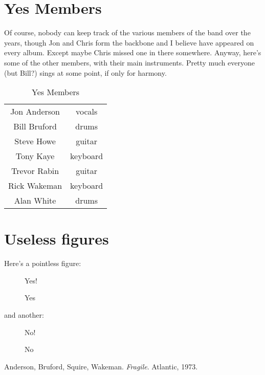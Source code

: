 \documentclass{easychithesis}
\begin{document}
\chapter{Yes Members}
Of course, nobody can keep track of the various members of the band 
over the years, though Jon and Chris form the backbone and I believe 
have appeared on every album.  Except maybe Chris missed one in there 
somewhere.  Anyway, here's some of the other members, with their main 
instruments.  Pretty much everyone (but Bill?) sings at some point, if 
only for harmony.
\begin{table}[h]
\begin{center}
\begin{tabular}{|c|c|}
        \hline
        Jon Anderson & vocals \\
        Bill Bruford & drums \\
        Steve Howe & guitar\\
        Tony Kaye & keyboard\\
        Trevor Rabin & guitar\\
        Rick Wakeman & keyboard\\
        Alan White &drums\\
        \hline
\end{tabular}
\caption{Yes Members}
\end{center}
\end{table}

\chapter{Useless figures}
Here's a pointless figure:
\begin{figure}[htbp]
  \begin{center}
    {\Huge Yes!}
    \caption{Yes}
  \end{center}
\end{figure}
and another:
\begin{figure}[htbp]
   \begin{center}
     {\Huge No!}
     \caption{No}
    \end{center}
\end{figure}

%
%

\singlespacing
\pagebreak
{}

\begin{thebibliography}{99}
Anderson, Bruford, Squire, Wakeman.  \emph{Fragile}.
  Atlantic, 1973.
\end{thebibliography}
\end{document}
